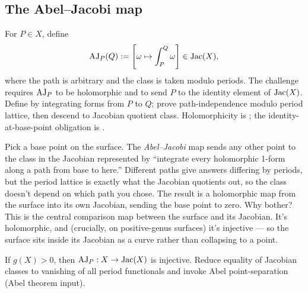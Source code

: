 \subsection{The Abel--Jacobi map}

\begin{definition}
\label{def:abel-jacobi}
For \(P\in X\), define
\[
  \operatorname{AJ}_P(Q) :=
    \left[ \omega \mapsto \int_{P}^{Q}\omega \right] \in \operatorname{Jac}(X),
\]
where the path is arbitrary and the class is taken modulo periods. The
challenge requires \(\operatorname{AJ}_P\) to be holomorphic and to send \(P\) to the
identity element of \(\operatorname{Jac}(X)\).
\leanok
\proofplan
Define by integrating forms from \(P\) to \(Q\); prove path-independence modulo
period lattice, then descend to Jacobian quotient class. Holomorphicity is
; the identity-at-base-point obligation is
.
\end{definition}

\begin{layman}
Pick a base point on the surface. The \emph{Abel--Jacobi} map sends
any other point to the class in the Jacobian represented by ``integrate
every holomorphic 1-form along a path from base to here.'' Different
paths give answers differing by periods, but the period lattice is
exactly what the Jacobian quotients out, so the class doesn't depend
on which path you chose. The result is a holomorphic map from the
surface into its own Jacobian, sending the base point to zero. Why
bother? This is the central comparison map between the surface and
its Jacobian. It's holomorphic, and (crucially, on positive-genus
surfaces) it's injective --- so the surface sits inside its Jacobian as a
curve rather than collapsing to a point.
\end{layman}

\begin{theorem}
\label{thm:abel-jacobi-injective}
If \(g(X)>0\), then \(\operatorname{AJ}_P : X\to \operatorname{Jac}(X)\) is injective.
\leanok
\proofplan
Reduce equality of Jacobian classes to vanishing of all period functionals and
invoke Abel point-separation (Abel theorem input).
\end{theorem}

